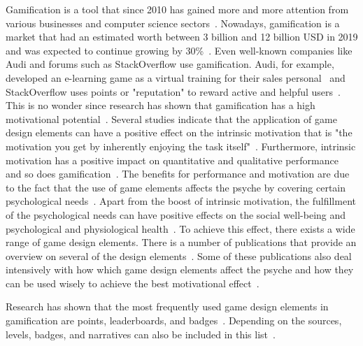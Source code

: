 Gamification is a tool that since 2010 has gained more and more attention from various businesses and computer science sectors~\cite{wirkungGamificationBuch}. Nowadays, gamification is a market that had an estimated worth between 3 billion and 12 billion USD in 2019 and was expected to continue growing by 30\%~\cite{statistaGamificationWorth, linkedInGamificationWorth}. Even well-known companies like Audi and forums such as StackOverflow use gamification. Audi, for example, developed an e-learning game as a virtual training for their sales personal~\cite{audi} and StackOverflow uses points or "reputation" to reward active and helpful users~\cite{stackoverflow}. This is no wonder since research has shown that gamification has a high motivational potential~\cite{wirkungGamificationBuch}. Several studies indicate that the application of game design elements can have a positive effect on the intrinsic motivation \cite{intrinsicMotivation, wirkungGamificationBuch} that is "the motivation you get by inherently enjoying the task itself"~\cite{actionableGamification}. Furthermore, intrinsic motivation has a positive impact on quantitative and qualitative performance~\cite{wirkungGamificationBuch} and so does gamification~\cite{intrinsicMotivation, wirkungGamificationBuch, actionableGamification, disassembling_gamification, gamifiedSearch, gamificationMotivation}. The benefits for performance and motivation are due to the fact that the use of game elements affects the psyche by covering certain psychological needs~\cite{actionableGamification, wirkungGamificationBuch}. Apart from the boost of intrinsic motivation, the fulfillment of the psychological needs can have positive effects on the social well-being and psychological and physiological health~\cite{wirkungGamificationBuch}. To achieve this effect, there exists a wide range of game design elements.
There is a number of publications that provide an overview on several of the design elements~\cite{gameElementsListing, actionableGamification, wirkungGamificationBuch, gamificationMotivation}. Some of these publications also deal intensively with how which game design elements affect the psyche and how they can be used wisely to achieve the best motivational effect~\cite{wirkungGamificationBuch, actionableGamification, gamificationMotivation}.\par
Research has shown that the most frequently used game design elements in gamification are points, leaderboards, and badges~\cite{actionableGamification}. Depending on the sources, levels, badges, and narratives can also be included in this list~\cite{wirkungGamificationBuch, gameCrowdsourcing}.\par
